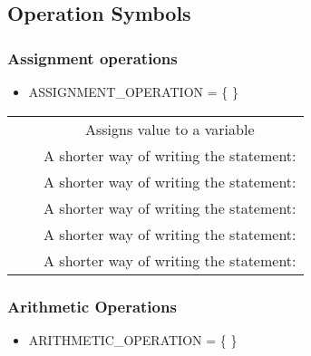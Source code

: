 \subsection{Operation Symbols}
\subsubsection{Assignment operations}
\begin{itemize}
\item ASSIGNMENT\_OPERATION = \{ \cd{=, +=, -=, /=, \%=} \}
\end{itemize}

\begin{center}
\begin{tabulary}{\linewidth}{|C|C|C|}
  \hline
   &  &  \\
  \hline
  \hline
  \cd{=} &  & Assigns value to a variable \\
  \hline
  \cd{+=} &  & A shorter way of writing the statement:  \\
  \hline
  \cd{-=} &  & A shorter way of writing the statement:  \\
  \hline
  \cd{*=} &  & A shorter way of writing the statement:  \\
  \hline
  \cd{/=} &  & A shorter way of writing the statement:  \\
  \hline
  \cd{\%=} &  & A shorter way of writing the statement:  \\
  \hline
\end{tabulary}
\end{center}

\subsubsection{Arithmetic Operations}

\begin{itemize}
  \item ARITHMETIC\_OPERATION = \{ \cd{+, -, *, /, //, \%, \^{}} \}
\end{itemize}


